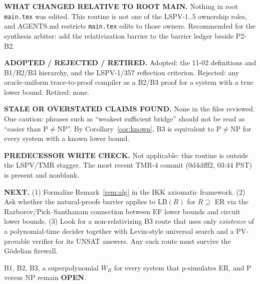 \documentclass[11pt]{article}
\newcommand{\Wb}{\overline W}
\begin{document}
\textbf{WHAT CHANGED RELATIVE TO ROOT MAIN.} Nothing in root \texttt{main.tex} was edited. This routine is not one of the LSPV-1..5 ownership roles, and AGENTS.md restricts \texttt{main.tex} edits to those owners. Recommended for the synthesis arbiter: add the relativization barrier to the barrier ledger beside P2-B2.

\textbf{ADOPTED / REJECTED / RETIRED.} Adopted: the 11-02 definitions and B1/B2/B3 hierarchy, and the LSPV-1/357 reflection criterion. Rejected: any oracle-uniform trace-to-proof compiler as a B2/B3 proof for a system with a true lower bound. Retired: none.

\textbf{STALE OR OVERSTATED CLAIMS FOUND.} None in the files reviewed. One caution: phrases such as ``weakest sufficient bridge'' should not be read as ``easier than P$\neq$NP''. By Corollary~\ref{cor:known}, B3 is equivalent to P$\neq$NP for every system with a known lower bound.

\textbf{PREDECESSOR WRITE CHECK.} Not applicable: this routine is outside the LSPV/TMR stagger. The most recent TMR-4 commit (0d4dfff2, 03:44 PST) is present and nonblank.

\textbf{NEXT.} (1) Formalize Remark~\ref{rem:alg} in the IKK axiomatic framework. (2) Ask whether the natural-proofs barrier applies to $\mathrm{LB}(R)$ for $R\supseteq$ ER via the Razborov/Pich--Santhanam connection between EF lower bounds and circuit lower bounds. (3) Look for a non-relativizing B3 route that uses only \emph{existence} of a polynomial-time decider together with Levin-style universal search and a PV-provable verifier for its UNSAT answers. Any such route must survive the G\"odelian firewall.

\medskip
\noindent B1, B2, B3, a superpolynomial $\Wb_R$ for every system that p-simulates ER, and P versus NP remain \textbf{OPEN}.
\end{document}
